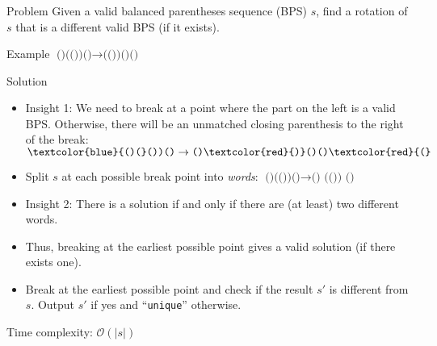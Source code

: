 \begin{frame}
    \frametitle{\problemtitle}

    \begin{block}{Problem}
		Given a valid balanced parentheses sequence (BPS) $s$, find a rotation
		of $s$ that is a different valid BPS (if it exists).
    \end{block}
	\begin{block}{Example}
		\Large
		$ \texttt{()(())()} \rightarrow \texttt{(())()()} $
	\end{block}
    \pause
    \begin{block}{Solution}
        \begin{itemize}
			\item Insight 1: We need to break at a point where the part on the
				left is a valid BPS.
				Otherwise, there will be an unmatched closing parenthesis to the
				right of the break: $\texttt{\textcolor{blue}{()(}())()} \rightarrow
					\texttt{()\textcolor{red}{)}()()\textcolor{red}{(}} $
				\pause
			\item Split $s$ at each possible break point into
				\emph{words}:
				$\texttt{()(())()} \rightarrow \texttt{() (()) ()} $
				\pause
			\item Insight 2: There is a solution if and only if there are (at
				least) two different words.
				\pause
			\item Thus, breaking at the earliest possible point gives a valid
				solution (if there exists one).
				\pause
			\item Break at the earliest possible point and check if the result
				$s'$ is different from $s$. Output $s'$ if yes and
				``\texttt{unique}'' otherwise.
				\pause
        \end{itemize}
		\vspace*{-5pt}
		Time complexity: $\mathcal{O}(|s|)$
    \end{block}
\end{frame}
